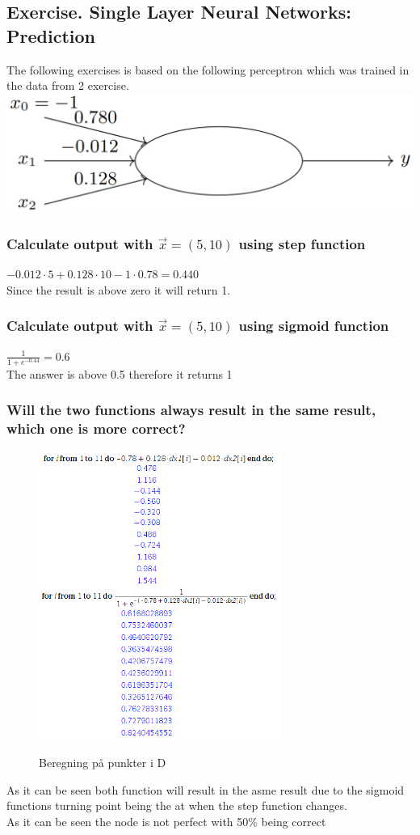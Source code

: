 \documentclass[12pt, a4paper]{article}
\begin{document}
		\subsection{Exercise. Single Layer Neural Networks: Prediction}
			The following exercises is based on the following perceptron which was trained in the data from 2 exercise.\\
			\includegraphics[width=\linewidth]{images/41,7.png}
			\subsubsection{Calculate output with $\vec{x}=(5,10)$ using step function}
				$-0.012\cdot 5 + 0.128\cdot 10-1\cdot 0.78=0.440$\\
				Since the result is above zero it will return 1.
			\subsubsection{Calculate output with $\vec{x}=(5,10)$ using sigmoid function}
				$\frac{1}{1+e^{-0.44}}=0.6$\\
				The answer is above 0.5 therefore it returns 1\\
			\subsubsection{Will the two functions always result in the same result, which one is more correct?}
				\begin{figure}[h!]
					\centering
					\includegraphics[width=300px]{images/41,7,3.png}
					\label{41.7.3}
					\caption{Beregning på punkter i D}
					\center
				\end{figure}
				As it can be seen both function will result in the asme result due to the sigmoid functions turning point being the at when the step function changes.\\
				As it can be seen the node is not perfect with 50\% being correct
\end{document}
